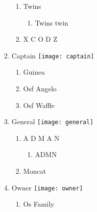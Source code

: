 \documentclass{article}
\begin{document}
\begin{enumerate}[I]
\begin{enumerate}[I]
      \item
	Twins
	  \begin{enumerate}[I]
	    \item
	      Twins twin
	  \end{enumerate}
      \item
	X C O D Z
    \end{enumerate}
  \item
    Captain \texttt{[image: captain]}
    \begin{enumerate}[I]
      \item
	Guinea
      \item
	Osf Angelo
      \item
	Osf Waffle
    \end{enumerate}
  \item
    General \texttt{[image: general]}
    \begin{enumerate}[I]
      \item
	A D M A N
	\begin{enumerate}[I]
	  \item
	    A\textunderscore D\textunderscore M\textunderscore N
	\end{enumerate}
      \item
	Moncat
    \end{enumerate}
  \item
    Owner \texttt{[image: owner]}
    \begin{enumerate}[I]
      \item
	Os Family
    \end{enumerate}
\end{enumerate}
\end{document}
